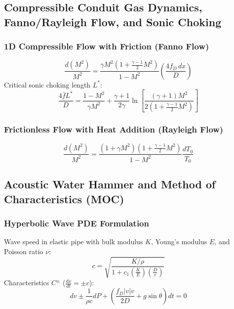 \documentclass[11pt,a4paper]{article}
\begin{document}
\subsection{Compressible Conduit Gas Dynamics, Fanno/Rayleigh Flow, and Sonic Choking}

\subsubsection{1D Compressible Flow with Friction (Fanno Flow)}
\begin{equation}
\frac{d(M^2)}{M^2} = \frac{\gamma M^2 \left( 1 + \frac{\gamma - 1}{2} M^2 \right)}{1 - M^2} \left( \frac{4 f_D \, dx}{D} \right)
\end{equation}
Critical sonic choking length $L^*$:
\begin{equation}
\frac{4 \bar{f} L^*}{D} = \frac{1 - M^2}{\gamma M^2} + \frac{\gamma + 1}{2 \gamma} \ln\left[ \frac{(\gamma + 1) M^2}{2 \left( 1 + \frac{\gamma - 1}{2} M^2 \right)} \right]
\end{equation}

\subsubsection{Frictionless Flow with Heat Addition (Rayleigh Flow)}
\begin{equation}
\frac{d(M^2)}{M^2} = \frac{(1 + \gamma M^2) \left( 1 + \frac{\gamma - 1}{2} M^2 \right)}{1 - M^2} \frac{d T_0}{T_0}
\end{equation}

\subsection{Acoustic Water Hammer and Method of Characteristics (MOC)}

\subsubsection{Hyperbolic Wave PDE Formulation}
Wave speed in elastic pipe with bulk modulus $K$, Young's modulus $E$, and Poisson ratio $\nu$:
\begin{equation}
c = \sqrt{\frac{K / \rho}{1 + c_1 \left( \frac{K}{E} \right) \left( \frac{D}{e} \right)}}
\end{equation}
Characteristics $C^\pm$ ($\frac{dx}{dt} = \pm c$):
\begin{equation}
dv \pm \frac{1}{\rho c} dP + \left( \frac{f_D |v| v}{2 D} + g \sin \theta \right) dt = 0
\end{equation}
\end{document}
